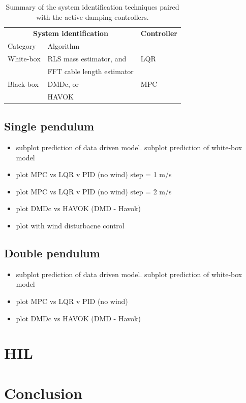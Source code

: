         \begin{table}[!h]
            \renewcommand{\arraystretch}{1.1}
            \centering
            \caption{Summary of the system identification techniques paired with the active damping controllers.}
            \begin{tabularx}{0.75\linewidth}{@{}lll@{}}
                \toprule
                \multicolumn{2}{c}{\textbf{System identification}}   & \textbf{Controller} \\
                \cmidrule(lr){1-2}
                Category    & Algorithm                     & \\
                \midrule
                White-box   & RLS mass estimator, and       & LQR \\
                            & FFT cable length estimator    & \\
                Black-box   & DMDc, or                      & MPC \\
                            & HAVOK                         & \\
                \bottomrule
            \end{tabularx}
            \label{tbl:controller_summary}
        \end{table}
        

        \FloatBarrier\subsection{Single pendulum}

            \begin{itemize}
                \item subplot prediction of data driven model. subplot prediction of white-box model
                \item plot MPC vs LQR v PID (no wind) step = 1 m/s
                \item plot MPC vs LQR v PID (no wind) step = 2 m/s
                \item plot DMDc vs HAVOK (DMD - Havok)
                \item plot with wind disturbacne control
            \end{itemize}

        \FloatBarrier\subsection{Double pendulum}

            \begin{itemize}
                \item subplot prediction of data driven model. subplot prediction of white-box model
                \item plot MPC vs LQR v PID (no wind)
                \item plot DMDc vs HAVOK (DMD - Havok)
            \end{itemize}

    \section{HIL}

    \section{Conclusion}



